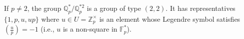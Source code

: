If $p \neq 2$, the group $\mathbb{Q}_p^*/\mathbb{Q}_p^{*2}$ is a group of type $(2,2)$. It has representatives $\{1, p, u, up\}$ where $u \in U = \mathbb{Z}_p^\times$ is an element whose Legendre symbol satisfies $\left(\frac{u}{p}\right) = -1$ (i.e., $u$ is a non-square in $\mathbb{F}_p^*$).
